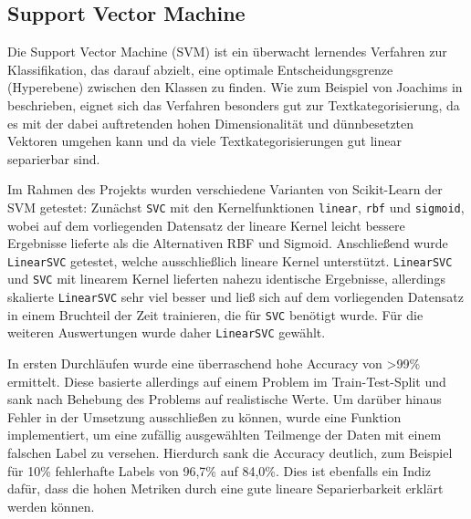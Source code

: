 \subsection{Support Vector Machine}
\label{SVM}

Die Support Vector Machine (SVM) ist ein überwacht lernendes Verfahren zur Klassifikation, das darauf abzielt, eine optimale Entscheidungsgrenze (Hyperebene) zwischen den Klassen zu finden. Wie zum Beispiel von Joachims in \cite{Joachims1998} beschrieben, eignet sich das Verfahren besonders gut zur Textkategorisierung, da es mit der dabei auftretenden hohen Dimensionalität und dünnbesetzten Vektoren umgehen kann und da viele Textkategorisierungen gut linear separierbar sind.

Im Rahmen des Projekts wurden verschiedene Varianten von Scikit-Learn \cite{Pedregosa2011} der SVM getestet: Zunächst \texttt{SVC} mit den Kernelfunktionen \texttt{linear}, \texttt{rbf} und \texttt{sigmoid}, wobei auf dem vorliegenden Datensatz der lineare Kernel leicht bessere Ergebnisse lieferte als die Alternativen RBF und Sigmoid. Anschließend wurde \texttt{LinearSVC} getestet, welche ausschließlich lineare Kernel unterstützt. \texttt{LinearSVC} und \texttt{SVC} mit linearem Kernel lieferten nahezu identische Ergebnisse, allerdings skalierte \texttt{LinearSVC} sehr viel besser und ließ sich auf dem vorliegenden Datensatz in einem Bruchteil der Zeit trainieren, die für \texttt{SVC} benötigt wurde. Für die weiteren Auswertungen wurde daher \texttt{LinearSVC} gewählt.

In ersten Durchläufen wurde eine überraschend hohe Accuracy von >99\% ermittelt. Diese basierte allerdings auf einem Problem im Train-Test-Split und sank nach Behebung des Problems auf realistische Werte. Um darüber hinaus Fehler in der Umsetzung ausschließen zu können, wurde eine Funktion implementiert, um eine zufällig ausgewählten Teilmenge der Daten mit einem falschen Label zu versehen. Hierdurch sank die Accuracy deutlich, zum Beispiel für 10\% fehlerhafte Labels von 96,7\% auf 84,0\%. Dies ist ebenfalls ein Indiz dafür, dass die hohen Metriken durch eine gute lineare Separierbarkeit erklärt werden können.
